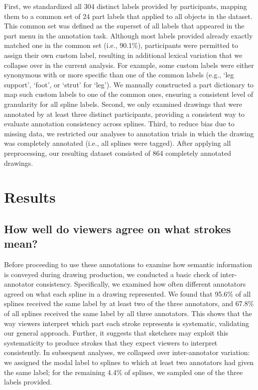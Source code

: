 \documentclass[10pt,letterpaper]{article}
\begin{document}

First, we standardized all 304 distinct labels provided by participants, mapping them to a common set of 24 part labels that applied to all objects in the dataset.
This common set was defined as the superset of all labels that appeared in the part menu in the annotation task. 
Although most labels provided already exactly matched one in the common set (i.e., 90.1\%), participants were permitted to assign their own custom label, resulting in additional lexical variation that we collapse over in the current analysis. 
For example, some custom labels were either synonymous with or more specific than one of the common labels (e.g., `leg support', `foot', or `strut' for `leg').
We manually constructed a part dictionary to map such custom labels to one of the common ones, ensuring a consistent level of granularity for all spline labels. 
Second, we only examined drawings that were annotated by at least three distinct participants, providing a consistent way to evaluate annotation consistency across splines. 
Third, to reduce bias due to missing data, we restricted our analyses to annotation trials in which the drawing was completely annotated (i.e., all splines were tagged). 
After applying all preprocessing, our resulting dataset consisted of 864 completely annotated drawings.

\section{Results}

\subsection{How well do viewers agree on what strokes mean?}

Before proceeding to use these annotations to examine how semantic information is conveyed during drawing production, we conducted a basic check of inter-annotator consistency. 
Specifically, we examined how often different annotators agreed on what each spline in a drawing represented.
We found that 95.6\% of all splines received the same label by at least two of the three annotators, and 67.8\% of all splines received the same label by all three annotators. 
This shows that the way viewers interpret which part each stroke represents is systematic, validating our general approach. 
Further, it suggests that sketchers may exploit this systematicity to produce strokes that they expect viewers to interpret consistently. 
In subsequent analyses, we collapsed over inter-annotator variation: we assigned the modal label to splines to which at least two annotators had given the same label; for the remaining 4.4\% of splines, we sampled one of the three labels provided.
\end{document}
